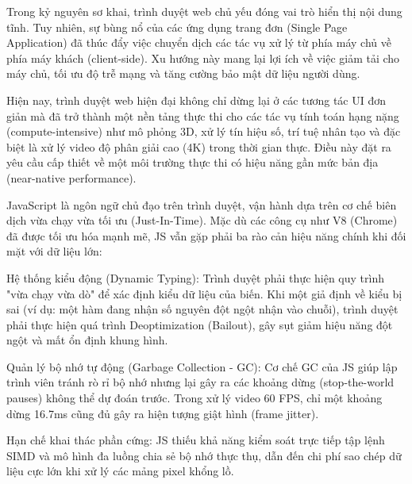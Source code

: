 


Trong kỷ nguyên sơ khai, trình duyệt web chủ yếu đóng vai trò hiển thị nội dung tĩnh. Tuy nhiên, sự bùng nổ của các ứng dụng trang đơn (Single Page Application) đã thúc đẩy việc chuyển dịch các tác vụ xử lý từ phía máy chủ về phía máy khách (client-side). Xu hướng này mang lại lợi ích về việc giảm tải cho máy chủ, tối ưu độ trễ mạng và tăng cường bảo mật dữ liệu người dùng.


Hiện nay, trình duyệt web hiện đại không chỉ dừng lại ở các tương tác UI đơn giản mà đã trở thành một nền tảng thực thi cho các tác vụ tính toán hạng nặng (compute-intensive) như mô phỏng 3D, xử lý tín hiệu số, trí tuệ nhân tạo và đặc biệt là xử lý video độ phân giải cao (4K) trong thời gian thực. Điều này đặt ra yêu cầu cấp thiết về một môi trường thực thi có hiệu năng gần mức bản địa (near-native performance).



JavaScript là ngôn ngữ chủ đạo trên trình duyệt, vận hành dựa trên cơ chế biên dịch vừa chạy vừa tối ưu (Just-In-Time). Mặc dù các công cụ như V8 (Chrome) đã được tối ưu hóa mạnh mẽ, JS vẫn gặp phải ba rào cản hiệu năng chính khi đối mặt với dữ liệu lớn:


Hệ thống kiểu động (Dynamic Typing): Trình duyệt phải thực hiện quy trình "vừa chạy vừa dò" để xác định kiểu dữ liệu của biến. Khi một giả định về kiểu bị sai (ví dụ: một hàm đang nhận số nguyên đột ngột nhận vào chuỗi), trình duyệt phải thực hiện quá trình Deoptimization (Bailout), gây sụt giảm hiệu năng đột ngột và mất ổn định khung hình.


Quản lý bộ nhớ tự động (Garbage Collection - GC): Cơ chế GC của JS giúp lập trình viên tránh rò rỉ bộ nhớ nhưng lại gây ra các khoảng dừng (stop-the-world pauses) không thể dự đoán trước. Trong xử lý video 60 FPS, chỉ một khoảng dừng 16.7ms cũng đủ gây ra hiện tượng giật hình (frame jitter).


Hạn chế khai thác phần cứng: JS thiếu khả năng kiểm soát trực tiếp tập lệnh SIMD và mô hình đa luồng chia sẻ bộ nhớ thực thụ, dẫn đến chi phí sao chép dữ liệu cực lớn khi xử lý các mảng pixel khổng lồ.



